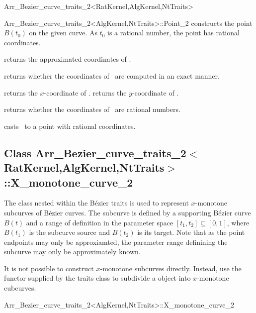 \begin{ccRefClass}{Arr_Bezier_curve_traits_2<RatKernel,AlgKernel,NtTraits>}
\begin{ccClass}{Arr_Bezier_curve_traits_2<AlgKernel,NtTraits>::Point_2}
  {constructs the point $B(t_0)$ on the given curve. As $t_0$ is a
   rational number, the point has rational coordinates.}

\ccAccessFunctions

  {returns the approximated coordinates of \ccVar.}

  {returns whether the coordinates of \ccVar\ are computed in an exact manner.}

  {returns the $x$-coordinate of \ccVar.
   }
\ccGlue
{}
  {returns the $y$-coordinate of \ccVar.
   }

  {returns whether the coordinates of \ccVar\ are rational numbers.}

  {casts \ccVar\ to a point with rational coordinates.
   }

\end{ccClass}


\subsection*{Class 
Arr\_Bezier\_curve\_traits\_2$<$RatKernel,AlgKernel,NtTraits$>$::X\_monotone\_curve\_2}

The  class nested within the B\'ezier traits is
used to represent $x$-monotone subcurves of B\'ezier curves. The subcurve is
defined by a supporting B\'ezier curve $B(t)$ and a range of definition in
the parameter space $[t_1, t_2] \subseteq [0, 1]$, where $B(t_1)$ is the
subcurve source and $B(t_2)$ is its target. Note that as the point endpoints
may only be approxiamted, the parameter range definining the subcurve may
only be approximately known.

It is not possible to construct $x$-monotone subcurves directly. Instead,
use the  functor supplied by the traits class to
subdivide a  object into $x$-monotone cubcurves.

\begin{ccClass}{Arr_Bezier_curve_traits_2<AlgKernel,NtTraits>::X_monotone_curve_2}


\end{ccClass}
\end{ccRefClass}
